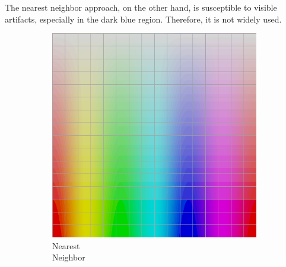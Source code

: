 The nearest neighbor approach, on the other hand, is susceptible to visible artifacts, especially in the dark blue region. Therefore, it is not widely used.

\begin{figure}[t]
	\centering
	\captionsetup[subfigure]{font=footnotesize,labelfont=footnotesize}
	\captionsetup[subfigure]{justification=centering}
	\hspace{0.22\textwidth}
	\begin{subfigure}[t]{0.22\textwidth}
		\includegraphics[width=\linewidth]{img/uplifting_texture_copyNeighbor.png}
		\caption{Nearest\\Neighbor}
		\label{fig:sigUpliftNearestNeighbor}
	\end{subfigure} \hspace{0.05em}
	\begin{subfigure}[t]{0.22\textwidth}

\end{subfigure}
\end{figure}

